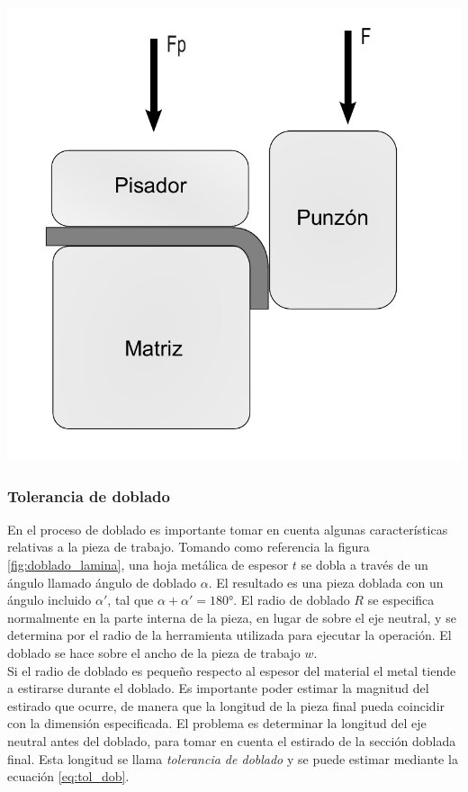 \begin{center}
\includegraphics[scale=0.4]{src/ch2/doblado_bordes}
\label{fig:doblado_bordes}
\end{center}


\subsubsection{Tolerancia de doblado}

En el proceso de doblado es importante tomar en cuenta algunas características relativas a la 
pieza de trabajo. Tomando como referencia la figura \ref{fig:doblado_lamina}, una hoja metálica 
de espesor $t$ se dobla a través de un ángulo llamado ángulo de doblado $\alpha$. El  resultado 
es una pieza doblada con un ángulo incluido $\alpha'$, tal que $\alpha + \alpha' = 180°$. 
El radio de doblado $R$ se especifica normalmente en la parte interna de la pieza, en lugar de 
sobre el eje neutral, y se determina por el radio de la herramienta utilizada para ejecutar 
la operación. El doblado se hace sobre el ancho de la pieza de trabajo $w$. ~\cite{groover2007}\\

Si el radio de doblado es pequeño respecto al espesor del material el metal tiende a estirarse 
durante el doblado. Es importante poder estimar la magnitud del estirado que ocurre, de manera 
que la longitud de la pieza final pueda coincidir con la dimensión especificada. El problema 
es determinar la longitud del eje neutral antes del doblado, para tomar en cuenta el estirado 
de la sección doblada final. Esta longitud se llama \textit{tolerancia de doblado} y se puede 
estimar mediante la ecuación \ref{eq:tol_dob}.

